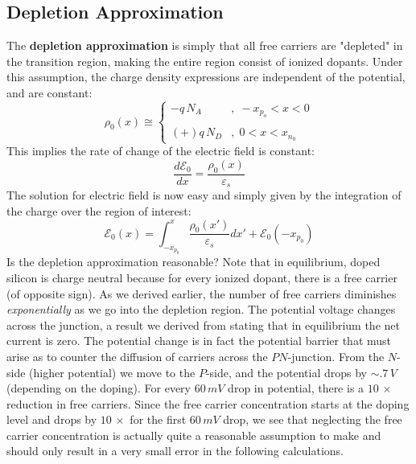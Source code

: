 \subsection{Depletion Approximation}
The \textbf{depletion approximation} is simply that all free carriers are "depleted" in the transition region, making the entire region consist of ionized dopants.  Under this assumption, the charge density expressions are independent of the potential, and are constant:
    \begin{equation}
        \rho _0(x) \cong
            \begin{cases} 
                -q\,N_A &,\; -x_{p_o} < x < 0 \\ \\
                (+)q\,N_D &,\; 0 < x < x_{n_0}
            \end{cases}
    \end{equation}
This implies the rate of change of the electric field is constant:
    \begin{equation} 
        \frac{{d{\mathcal{E}_0}}}{{dx}} = \frac{{{\rho _0}(x)}}{{{\varepsilon _s}}}
    \end{equation}
The solution for electric field is now easy and simply given by the integration of the charge over the region of interest:
    \begin{equation}
        \mathcal{E}_0(x) = \int_{-x_{p_0}}^x \frac{\rho _0(x')}{\varepsilon_s}dx' + \mathcal{E}_0(-x_{p_0}) 
    \end{equation}
Is the depletion approximation reasonable?  Note that in equilibrium, doped silicon is charge neutral because for every ionized dopant, there is a free carrier (of opposite sign).  As we derived earlier, the number of free carriers diminishes \textit{exponentially} as we go into the depletion region.  The potential voltage changes across the junction, a result we derived from stating that in equilibrium the net  current is zero.  The potential change is in fact the potential barrier that must arise as to counter the diffusion of carriers across the $PN$-junction.   From the $N$-side (higher potential) we move to the $P$-side, and the potential drops by $\sim.7\,V$ (depending on the doping).  For every $60\,mV$ drop in potential, there is a $10\,\times$ reduction in free carriers.  Since the free carrier concentration starts at the doping level and drops by $10\,\times$ for the first $60\,mV$ drop, we see that neglecting the free carrier concentration is actually quite a reasonable assumption to make and should only result in a very small error in the following calculations.

